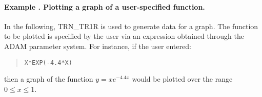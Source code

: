 \documentclass[twoside,11pt]{article}
\newcommand{\name}[1]{\mbox{\small{#1}}}
\newcounter{examplecounter}
\newcommand{\example}[1]{\addtocounter{examplecounter}{1}
                         \paragraph{\textbf{Example \theexamplecounter. #1}}}
\begin{document}
\example{Plotting a graph of a user-specified function.}
In the following, \name{TRN\_TR1R} is used to generate data for a graph. 
The function to be plotted is specified by the user via an expression
obtained through the \name{ADAM} parameter system. 
For instance, if the user entered:

\begin{quote}
\begin{verbatim}
X*EXP(-4.4*X)
\end{verbatim}
\end{quote}

then a graph of the function \mbox{$y=xe^{-4.4x}$} would be plotted over the 
range \mbox{$0\le x\le 1$}.

\begin{quote}
\begin{tabbing} %


\end{tabbing}
\end{quote}
\end{document}
